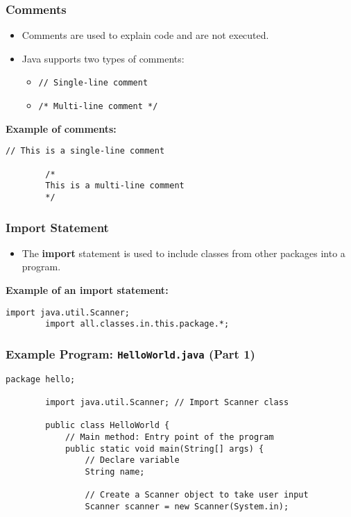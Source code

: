 \documentclass[aspectratio=169, table]{beamer}
\begin{document}
\begin{frame}[fragile]
	\frametitle{Comments }
	
	\begin{itemize}
		\item Comments are used to explain code and are not executed.
		\item Java supports two types of comments:
		\begin{itemize}
			\item \texttt{// Single-line comment}
			\item \texttt{/* Multi-line comment */}
		\end{itemize}
	\end{itemize}
	
	\textbf{Example of comments:}
	
	\begin{lstlisting}[style=JavaStyle]
		// This is a single-line comment
		
		/*
		This is a multi-line comment
		*/
	\end{lstlisting}
\end{frame}

\begin{frame}[fragile]
	\frametitle{Import Statement }
	
	\begin{itemize}
		\item The \textbf{import} statement is used to include classes from other packages into a program.
	\end{itemize}
	
	\textbf{Example of an import statement:}
	
	\begin{lstlisting}[style=JavaStyle]
		import java.util.Scanner;
		import all.classes.in.this.package.*;
	\end{lstlisting}
\end{frame}


\begin{frame}[fragile]
	\frametitle{Example Program: \texttt{HelloWorld.java} (Part 1)}
	
	\begin{lstlisting}[style=JavaStyle, caption={Example Program: HelloWorld.java (Part 1)}]
		package hello;
		
		import java.util.Scanner; // Import Scanner class
		
		public class HelloWorld {
			// Main method: Entry point of the program
			public static void main(String[] args) {
				// Declare variable
				String name;
				
				// Create a Scanner object to take user input
				Scanner scanner = new Scanner(System.in);
			\end{lstlisting}
		\end{frame}
		
\end{document}
